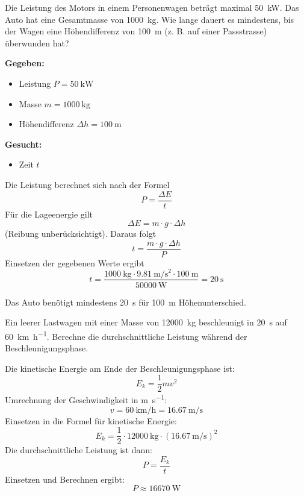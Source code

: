 \begin{questions}

\question
Die Leistung des Motors in einem Personenwagen beträgt maximal \SI{50}{\kilo\watt}. Das Auto hat eine Gesamtmasse von \SI{1000}{\kilo\gram}. Wie lange dauert es mindestens, bis der Wagen eine Höhendifferenz von \SI{100}{\meter} (z. B. auf einer Passstrasse) überwunden hat?

\begin{solution}

\textbf{Gegeben:}
\begin{itemize}
    \item Leistung $P = \SI{50}{\kilo\watt}$
    \item Masse $m = \SI{1000}{\kilo\gram}$
    \item Höhendifferenz $\Delta h = \SI{100}{\meter}$
\end{itemize}

\textbf{Gesucht:}
\begin{itemize}
    \item Zeit $t$
\end{itemize}

Die Leistung berechnet sich nach der Formel 
\[ P = \frac{\Delta E}{t} \]
Für die Lageenergie gilt 
\[ \Delta E = m \cdot g \cdot \Delta h \]
(Reibung unberücksichtigt). Daraus folgt
\[ t = \frac{m \cdot g \cdot \Delta h}{P} \]
Einsetzen der gegebenen Werte ergibt
\[ t = \frac{\SI{1000}{\kilo\gram} \cdot \SI{9.81}{\meter\per\second\squared} \cdot \SI{100}{\meter}}{\SI{50000}{\watt}} = \SI{20}{\second} \]

Das Auto benötigt mindestens \SI{20}{\second} für \SI{100}{\meter} Höhenunterschied.

\end{solution}




\question
Ein leerer Lastwagen mit einer Masse von \SI{12000}{\kilo\gram} beschleunigt in \SI{20}{\second} auf \SI{60}{\kilo\meter\per\hour}. Berechne die durchschnittliche Leistung während der Beschleunigungsphase.

\begin{solution}
Die kinetische Energie am Ende der Beschleunigungsphase ist:
\[ E_k = \frac{1}{2} m v^2 \]
Umrechnung der Geschwindigkeit in \si{\meter\per\second}:
\[ v = \SI{60}{\kilo\meter\per\hour} = \SI{16.67}{\meter\per\second} \]
Einsetzen in die Formel für kinetische Energie:
\[ E_k = \frac{1}{2} \cdot \SI{12000}{\kilo\gram} \cdot (\SI{16.67}{\meter\per\second})^2 \]
Die durchschnittliche Leistung ist dann:
\[ P = \frac{E_k}{t} \]
Einsetzen und Berechnen ergibt:
\[ P \approx \SI{16670}{\watt} \]
\end{solution}


\end{questions}
